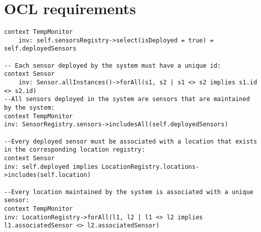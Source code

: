 \documentclass{article}
\begin{document}
\section{OCL requirements}

\begin{lstlisting}[caption={Requirements pt1}]
context TempMonitor
    inv: self.sensorsRegistry->select(isDeployed = true) = self.deployedSensors

-- Each sensor deployed by the system must have a unique id:
context Sensor
    inv: Sensor.allInstances()->forAll(s1, s2 | s1 <> s2 implies s1.id <> s2.id)
--All sensors deployed in the system are sensors that are maintained by the system:
context TempMonitor
inv: SensorRegistry.sensors->includesAll(self.deployedSensors)

--Every deployed sensor must be associated with a location that exists in the corresponding location registry:
context Sensor
inv: self.deployed implies LocationRegistry.locations->includes(self.location)

--Every location maintained by the system is associated with a unique sensor:
context TempMonitor
inv: LocationRegistry->forAll(l1, l2 | l1 <> l2 implies l1.associatedSensor <> l2.associatedSensor)


\end{lstlisting}
\end{document}
